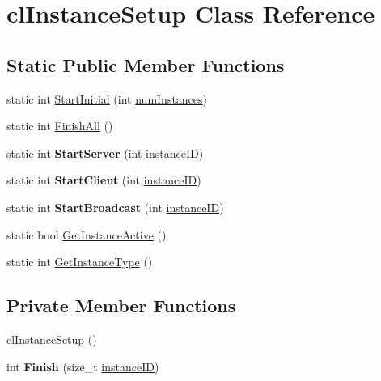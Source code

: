 \hypertarget{classcl_instance_setup}{
\section{clInstanceSetup Class Reference}
\label{classcl_instance_setup}
}
\subsection*{Static Public Member Functions}
\begin{DoxyCompactItemize}
\item 
static int \hyperlink{classcl_instance_setup_af5cb540183530a759bc262debfca9e34}{StartInitial} (int \hyperlink{classcl_instance_setup_a4163ffe3de7fb003f97e436491235b28}{numInstances})
\item 
static int \hyperlink{classcl_instance_setup_a82ee23ff6eb6dd9a070c7c1333383e7f}{FinishAll} ()
\item 
\hypertarget{classcl_instance_setup_a51e2667cc11f4157ba45721e56d0339e}{
static int {\bfseries StartServer} (int \hyperlink{classcl_instance_setup_aca3c51adce99fa0900b023a4ab313a57}{instanceID})}
\label{classcl_instance_setup_a51e2667cc11f4157ba45721e56d0339e}

\item 
\hypertarget{classcl_instance_setup_a23bee286e8454f8fdb7f9c6c83ad3239}{
static int {\bfseries StartClient} (int \hyperlink{classcl_instance_setup_aca3c51adce99fa0900b023a4ab313a57}{instanceID})}
\label{classcl_instance_setup_a23bee286e8454f8fdb7f9c6c83ad3239}

\item 
\hypertarget{classcl_instance_setup_a61c2e4aae020585d5223f54a0592c099}{
static int {\bfseries StartBroadcast} (int \hyperlink{classcl_instance_setup_aca3c51adce99fa0900b023a4ab313a57}{instanceID})}
\label{classcl_instance_setup_a61c2e4aae020585d5223f54a0592c099}

\item 
static bool \hyperlink{classcl_instance_setup_a2197f516509bb20a8ed0d7330cc892bb}{GetInstanceActive} ()
\item 
static int \hyperlink{classcl_instance_setup_af456c8408da960ec6ae3cec57da1f17b}{GetInstanceType} ()
\end{DoxyCompactItemize}
\subsection*{Private Member Functions}
\begin{DoxyCompactItemize}
\item 
\hyperlink{classcl_instance_setup_a4176ba764e03839962dc65563d3b35bb}{clInstanceSetup} ()
\item 
\hypertarget{classcl_instance_setup_ad25d6f8d89dab8d655ae57a2133aa056}{
int {\bfseries Finish} (size\_\-t \hyperlink{classcl_instance_setup_aca3c51adce99fa0900b023a4ab313a57}{instanceID})}
\label{classcl_instance_setup_ad25d6f8d89dab8d655ae57a2133aa056}

\end{DoxyCompactItemize}

